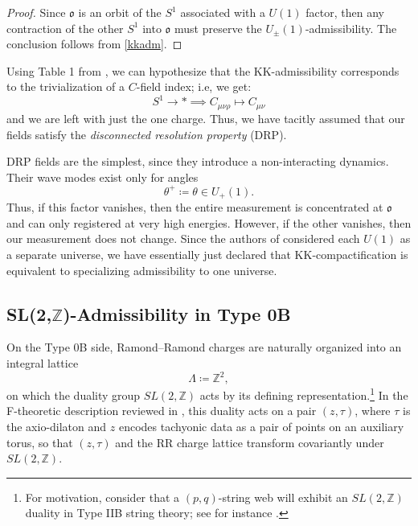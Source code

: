 \documentclass{article}
\numberwithin{tm}{section}
\numberwithin{dn}{section}
\numberwithin{as}{section}
\numberwithin{rk}{section}
\numberwithin{lem}{section}
\numberwithin{ax}{section}
\numberwithin{pp}{section}
\numberwithin{eg}{section}
\numberwithin{war}{section}
\numberwithin{equation}{section}
\numberwithin{prop}{section}
\numberwithin{nt}{section}
\numberwithin{rc}{section}
\numberwithin{setup}{section}
\begin{document}
	\begin{proof}
		Since $\mathfrak{o}$ is an orbit of the $S^1$ associated with a $U(1)$ factor, then any contraction of the other $S^1$ into $\mathfrak{o}$ must preserve the $U_\pm(1)$-admissibility. The conclusion follows from \ref{kkadm}.
	\end{proof}
	
	Using Table 1 from \cite{Baykara:2603.13468}, we can hypothesize that the KK-admissibility corresponds to the trivialization of a $C$-field index; i.e, we get:
	\begin{equation}
		S^1 \to \ast \implies C_{\mu \nu \rho} \mapsto C_{\mu \nu}
	\end{equation}
	and we are left with just the one charge. Thus, we have tacitly assumed that our fields satisfy the \emph{disconnected resolution property} (DRP). 
	
	DRP fields are the simplest, since they introduce a non-interacting dynamics. Their wave modes exist only for angles
	$$\theta^+ \coloneq \theta \in U_+(1).$$
	Thus, if this factor vanishes, then the entire measurement is concentrated at $\mathfrak{o}$ and can only registered at very high energies. However, if the other vanishes, then our measurement does not change. Since the authors of \cite{Baykara:2603.13468} considered each $U(1)$ as a separate universe, we have essentially just declared that KK-compactification is equivalent to specializing admissibility to one universe.
	
	\subsection{SL(2,$\mathbb{Z}$)-Admissibility in Type 0B}
	
	On the Type 0B side, Ramond–Ramond charges are naturally organized into an integral lattice
	\[
	\Lambda \coloneq \mathbb{Z}^2,
	\]
	on which the duality group $SL(2,\mathbb{Z})$ acts by its defining representation.\footnote{For motivation, consider that a $(p,q)$-string web will exhibit an $SL(2,\mathbb{Z})$ duality in Type IIB string theory; see for instance \cite{Bergshoeff}.} In the F-theoretic description reviewed in \cite{Baykara:2603.13468}, this duality acts on a pair $(z,\tau)$, where $\tau$ is the axio-dilaton and $z$ encodes tachyonic data as a pair of points on an auxiliary torus, so that $(z,\tau)$ and the RR charge lattice transform covariantly under $SL(2,\mathbb{Z})$.
	
\end{document}
